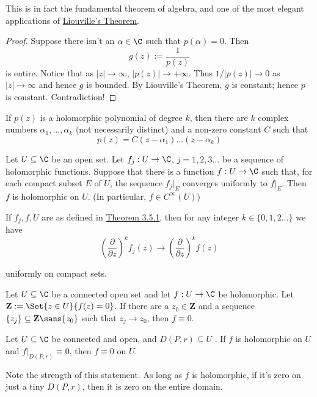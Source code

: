 This is in fact the fundamental theorem of algebra, and one of the most elegant
applications of \href{cf6d8a9}{Liouville's Theorem}.

\begin{proof}
  Suppose there isn't an $\alpha\in\C$ such that $p(\alpha)=0$. Then
  $$
    g(z):=\frac1{p(z)}
  $$
  is entire. Notice that as $|z|\to\infty$, $|p(z)|\to+\infty$. Thus
  $1/|p(z)|\to0$ as $|z|\to\infty$ and hence $g$ is bounded. By Liouville's
  Theorem, $g$ is constant; hence $p$ is constant. Contradiction!
\end{proof}

\label{cae4be0}

If $p(z)$ is a holomorphic polynomial of degree $k$, then there are $k$ complex
numbers $\alpha_1,\ldots,\alpha_k$ (not necessarily distinct) and a non-zero
constant $C$ such that
$$
  p(z)=C(z-\alpha_1)\ldots(z-\alpha_k)
$$

\label{c4e6d08}

Let $U\subseteq\C$ be an open set. Let $f_j:U\to\C$, $j=1,2,3\ldots$ be a
sequence of holomorphic functions. Suppose that there is a function $f:U\to\C$
such that, for each compact subset $E$ of $U$, the sequence $f_j|_E$ converges
uniformly to $f|_E$. Then $f$ is holomorphic on $U$. (In particular, $f\in
C^\infty(U)$)

\label{f5163f1}

If $f_j,f,U$ are as defined in \href{c4e6d08}{Theorem 3.5.1}, then for any
integer $k\in\{0,1,2\ldots\}$ we have
$$
  \left(\frac\partial{\partial z}\right)^kf_j(z)\to\left(\frac\partial{\partial z}\right)^kf(z)
$$

uniformly on compact sets.

\label{bdc2857}

Let $U\subseteq\C$ be a connected open set and let $f:U\to\C$ be holomorphic.
Let $\mathbf Z:=\Set{z\in U}{f(z)=0}$. If there are a $z_0\in\mathbf Z$ and a
sequence $\{z_j\}\subseteq\mathbf Z\sans{z_0}$ such that $z_j\to z_0$, then
$f\equiv0$.

\label{b919101}

Let $U\subseteq\C$ be connected and open, and $D(P,r)\subseteq U$ . If $f$ is
holomorphic on $U$ and $f|_{D(P,r)}\equiv0$, then $f\equiv0$ on $U$.

Note the strength of this statement. As long as $f$ is holomorphic, if it's
zero on just a tiny $D(P,r)$, then it is zero on the entire domain.


